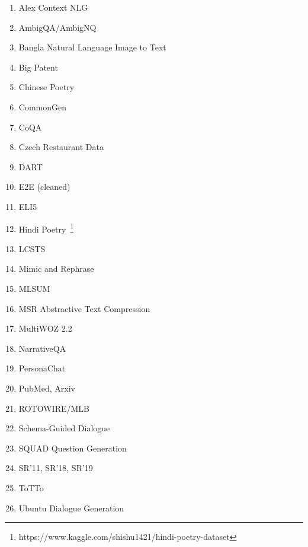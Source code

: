 \documentclass[11pt,a4paper]{article}
\begin{document}
\begin{enumerate}[itemsep=0mm]
    \item Alex Context NLG~\citep{duvsek28context,dusek2016context}
    \item AmbigQA/AmbigNQ~\citep{min2020ambigqa}
    \item Bangla Natural Language Image to Text~\citep{jishan2020bangla}
    \item Big Patent~\citep{sharma2019bigpatent}
    \item Chinese Poetry~\citep{zhang-lapata-2014-chinese}
    \item CommonGen~\citep{lin2019commongen}
    \item CoQA~\citep{reddy-etal-2019-coqa}
    \item Czech Restaurant Data~\citep{duvsek2019neural}
    \item DART~\citep{radev2020dart}
    \item E2E (cleaned)~\citep{novikova2017e2e,duvsek2019semantic}
    \item ELI5~\citep{fan-etal-2019-eli5}
    \item Hindi Poetry~\footnote{https://www.kaggle.com/shishu1421/hindi-poetry-dataset}
    \item LCSTS~\citep{hu-etal-2015-lcsts}
    \item Mimic and Rephrase~\citep{dieter-etal-2019-mimic}
    \item MLSUM~\citep{scialom2020mlsum}
    \item MSR Abstractive Text Compression~\citep{toutanova-etal-2016-dataset}
    \item MultiWOZ 2.2~\citep{zang2020multiwoz}
    \item NarrativeQA~\citep{kovcisky2018narrativeqa}
    \item PersonaChat~\citep{zhang2018personalizing}
    \item PubMed, Arxiv~\citep{kedzie2018content,cohan2018discourse}
    \item ROTOWIRE/MLB~\citep{wiseman-etal-2017-challenges,puduppully-etal-2019-data}
    \item Schema-Guided Dialogue~\citep{rastogi2019towards}
    \item SQUAD Question Generation~\citep{du2017learning}
    \item SR'11, SR'18, SR'19~\citep{belz-etal-2011-first,mille2018first,mille2019proceedings}
    \item ToTTo~\citep{parikh2020totto}
    \item Ubuntu Dialogue Generation~\citep{lowe-etal-2015-ubuntu}

\end{enumerate}
\end{document}
